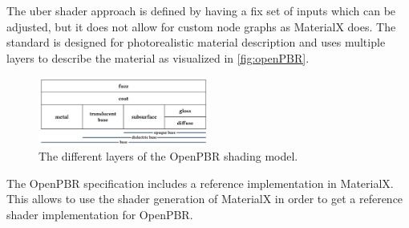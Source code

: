The \gls{uber shader} approach is defined by having a fix set of inputs which can be adjusted, but it does not allow for custom node graphs as \gls{MaterialX} does. The standard is designed for photorealistic material description and uses multiple layers to describe the material as visualized in \autoref{fig:openPBR}.

\begin{figure}[H]
  \centering
  \includegraphics[width=0.5\textwidth]{resources/openpbr.png}
  \caption{The different layers of the \gls{OpenPBR} shading model.}
  \label{fig:openPBR}
\end{figure}

The \gls{OpenPBR} specification includes a reference implementation in \gls{MaterialX}. This allows to use the shader generation of \gls{MaterialX} in order to get a reference shader implementation for \gls{OpenPBR}.
